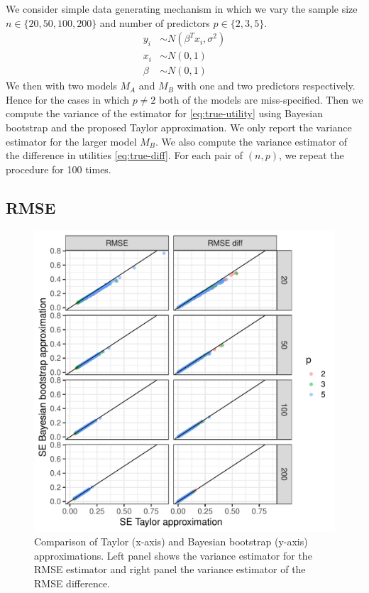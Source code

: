 \documentclass{article}
\begin{document}
We consider simple data generating  mechanism in which we vary the sample size $n \in \{20, 50, 100, 200 \}$ and number of predictors $p \in \{ 2, 3, 5 \}$.
\begin{equation*}
    \begin{aligned}
    y_i &\sim N(\beta^T x_i, \sigma^2) \\
    x_i &\sim N(0, 1) \\
    \beta &\sim N(0, 1)
    \end{aligned}
\end{equation*}
We then with two models $M_A$ and $M_B$ with one and two predictors respectively. Hence for the cases in which $p \neq 2$ both of the models are miss-specified. Then we compute the variance of the estimator for \eqref{eq:true-utility} using Bayesian bootstrap and the proposed Taylor approximation. We only report the variance estimator for the larger model $M_B$. We also compute the variance estimator of the difference in utilities \eqref{eq:true-diff}. For each pair of $(n, p)$, we repeat the procedure for 100 times.

\subsection{RMSE}
\begin{figure}[!htb]
    \centering
    \includegraphics[width=\textwidth]{rmse.pdf}
    \caption{Comparison of Taylor (x-axis) and Bayesian bootstrap (y-axis) approximations. Left panel shows the variance estimator for the RMSE estimator and right panel the variance estimator of the RMSE difference.}
    \label{fig:rmse-plot}
\end{figure}
\end{document}
